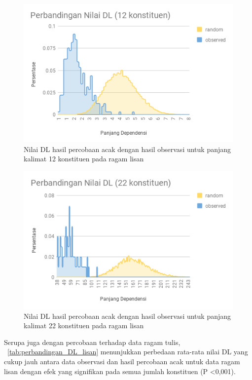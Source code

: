 \begin{figure}
	\centering \includegraphics[width=1
	\textwidth] {pics/l12randomobs.png} 
	\caption{ Nilai DL hasil percobaan acak dengan hasil observasi untuk panjang kalimat 12 konstituen pada ragam lisan} 
	\label{fig:l12randomobs} 
\end{figure}

\begin{figure}
	\centering \includegraphics[width=1
	\textwidth] {pics/l22randomobs.png} 
	\caption{ Nilai DL hasil percobaan acak dengan hasil observasi untuk panjang kalimat 22 konstituen pada ragam lisan} 
	\label{fig:l22randomobs} 
\end{figure}

Serupa juga dengan percobaan terhadap data ragam tulis, \tab~\ref{tab:perbandingan_DL_lisan} menunjukkan perbedaan rata-rata nilai DL yang cukup jauh antara data observasi dan hasil percobaan acak untuk data ragam lisan dengan efek yang signifikan pada semua jumlah konstituen (P \textless 0,001).

